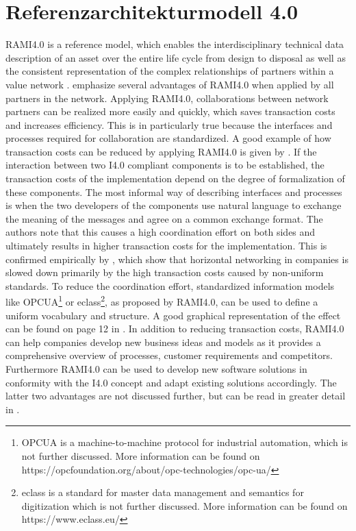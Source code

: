 \section{Referenzarchitekturmodell 4.0} \label{sec:rami40}
\ac{RAMI4.0} is a reference model, which enables the interdisciplinary technical data description of an asset over the entire life cycle from design to disposal as well as the consistent representation of the complex relationships of partners within a value network \cite[p. 4]{Heidel2017ReferenzarchitekturmodellIndustrie4.0Komponente}. \citet[p. 23]{Arnold2018DigitaleMittelstand} emphasize several advantages of \ac{RAMI4.0} when applied by all partners in the network. Applying \ac{RAMI4.0}, collaborations between network partners can be realized more easily and quickly, which saves transaction costs and increases efficiency. This is in particularly true because the interfaces and processes required for collaboration are standardized. A good example of how transaction costs can be reduced by applying \ac{RAMI4.0} is given by \citet[p. 11]{Bayha2020DescribingComponents}. If the interaction between two \ac{I4.0} compliant components is to be established, the transaction costs of the implementation depend on the degree of formalization of these components. The most informal way of describing interfaces and processes is when the two developers of the components use natural language to exchange the meaning of the messages and agree on a common exchange format. The authors note that this causes a high coordination effort on both sides and ultimately results in higher transaction costs for the implementation. This is confirmed empirically by \citet[p. 14]{Arnold2018DigitaleMittelstand}, which show that horizontal networking in companies is slowed down primarily by the high transaction costs caused by non-uniform standards. To reduce the coordination effort, standardized information models like \ac{OPCUA}\footnote{\ac{OPCUA} is a machine-to-machine protocol for industrial automation, which is not further discussed. More information can be found on https://opcfoundation.org/about/opc-technologies/opc-ua/} or eclass\footnote{eclass is a standard for master data management and semantics for digitization which is not further discussed. More information can be found on https://www.eclass.eu/}, as proposed by \ac{RAMI4.0}, can be used to define a uniform vocabulary and structure. A good graphical representation of the effect can be found on page 12 in \citet{Bayha2020DescribingComponents}. In addition to reducing transaction costs, \ac{RAMI4.0} can help companies develop new business ideas and models as it provides a comprehensive overview of processes, customer requirements and competitors. Furthermore \ac{RAMI4.0} can be used to develop new software solutions in conformity with the \ac{I4.0} concept and adapt existing solutions accordingly. The latter two advantages are not discussed further, but can be read in greater detail in \citet[p. 24 ff]{Arnold2018DigitaleMittelstand}.

